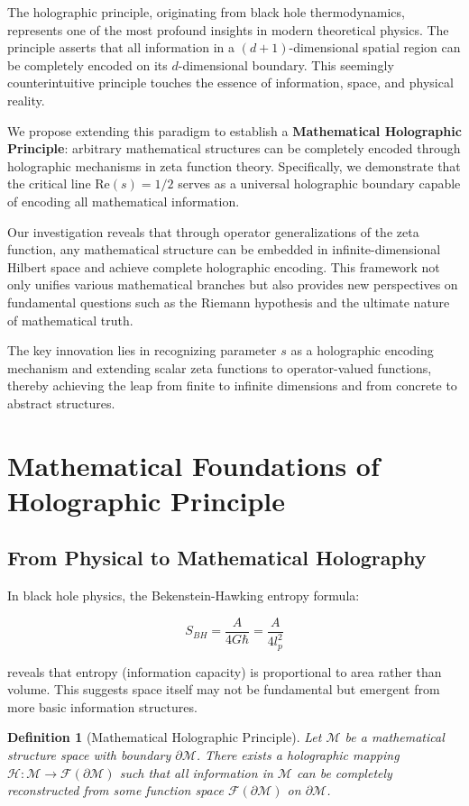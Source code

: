 \documentclass[12pt]{article}
\newtheorem{definition}[theorem]{Definition}
\begin{document}
The holographic principle, originating from black hole thermodynamics, represents one of the most profound insights in modern theoretical physics. The principle asserts that all information in a $(d+1)$-dimensional spatial region can be completely encoded on its $d$-dimensional boundary. This seemingly counterintuitive principle touches the essence of information, space, and physical reality.

We propose extending this paradigm to establish a \textbf{Mathematical Holographic Principle}: arbitrary mathematical structures can be completely encoded through holographic mechanisms in zeta function theory. Specifically, we demonstrate that the critical line $\text{Re}(s) = 1/2$ serves as a universal holographic boundary capable of encoding all mathematical information.

Our investigation reveals that through operator generalizations of the zeta function, any mathematical structure can be embedded in infinite-dimensional Hilbert space and achieve complete holographic encoding. This framework not only unifies various mathematical branches but also provides new perspectives on fundamental questions such as the Riemann hypothesis and the ultimate nature of mathematical truth.

The key innovation lies in recognizing parameter $s$ as a holographic encoding mechanism and extending scalar zeta functions to operator-valued functions, thereby achieving the leap from finite to infinite dimensions and from concrete to abstract structures.

\section{Mathematical Foundations of Holographic Principle}

\subsection{From Physical to Mathematical Holography}

In black hole physics, the Bekenstein-Hawking entropy formula:

$$S_{BH} = \frac{A}{4G\hbar} = \frac{A}{4l_p^2}$$

reveals that entropy (information capacity) is proportional to area rather than volume. This suggests space itself may not be fundamental but emergent from more basic information structures.

\begin{definition}[Mathematical Holographic Principle]
Let $\mathcal{M}$ be a mathematical structure space with boundary $\partial\mathcal{M}$. There exists a holographic mapping $\mathcal{H}: \mathcal{M} \to \mathcal{F}(\partial\mathcal{M})$ such that all information in $\mathcal{M}$ can be completely reconstructed from some function space $\mathcal{F}(\partial\mathcal{M})$ on $\partial\mathcal{M}$.
\end{definition}
\end{document}
